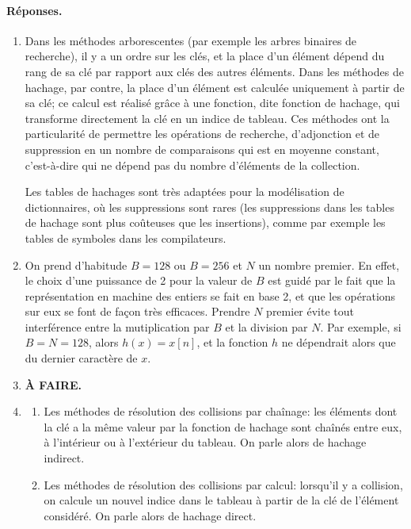 \paragraph{Réponses.}

\begin{enumerate}

  \item Dans les méthodes arborescentes (par exemple les arbres
    binaires de recherche), il y a un ordre sur les clés, et la place
    d'un élément dépend du rang de sa clé par rapport aux clés des
    autres éléments. Dans les méthodes de hachage, par contre, la
    place d'un élément est calculée uniquement à partir de sa clé; ce
    calcul est réalisé grâce à une fonction, dite fonction de hachage,
    qui transforme directement la clé en un indice de tableau. Ces
    méthodes ont la particularité de permettre les opérations de
    recherche, d'adjonction et de suppression en un nombre de
    comparaisons qui est en moyenne constant, c'est-à-dire qui ne
    dépend pas du nombre d'éléments de la collection.

    Les tables de hachages sont très adaptées pour la modélisation de
    dictionnaires, où les suppressions sont rares (les suppressions
    dans les tables de hachage sont plus coûteuses que les
    insertions), comme par exemple les tables de symboles dans les
    compilateurs.

  \item On prend d'habitude \(B=128\) ou \(B=256\) et \(N\) un nombre
    premier. En effet, le choix d'une puissance de 2 pour la valeur de
    \(B\) est guidé par le fait que la représentation en machine des
    entiers se fait en base 2, et que les opérations sur eux se font
    de façon très efficaces. Prendre \(N\) premier évite tout
    interférence entre la mutiplication par \(B\) et la division par
    \(N\). Par exemple, si \(B=N=128\), alors \(h(x)=x[n]\), et la
    fonction \(h\) ne dépendrait alors que du dernier caractère de
    \(x\).

  \item \textbf{À FAIRE.}

  \item
    \begin{enumerate}

    \item Les méthodes de résolution des collisions par chaînage: les
      éléments dont la clé a la même valeur par la fonction de hachage
      sont chaînés entre eux, à l'intérieur ou à l'extérieur du
      tableau. On parle alors de hachage indirect.

    \item Les méthodes de résolution des collisions par calcul:
      lorsqu'il y a collision, on calcule un nouvel indice dans le
      tableau à partir de la clé de l'élément considéré. On parle
      alors de hachage direct.

    \end{enumerate}

\end{enumerate}
